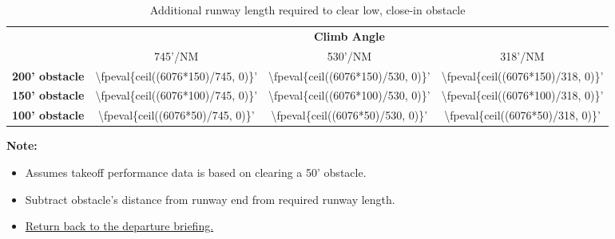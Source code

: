\begin{table}[H]
    \hypertarget{runway-length-table}{\caption{Additional runway length required to clear low, close-in obstacle}}

    \begin{center}
        \begin{tabular}{lccc}
            \toprule
                                   & \multicolumn{3}{c}{\textbf{Climb Angle}}
            \\\cmidrule(lr){2-4}
                                   & 745'/NM                                  & 530'/NM                                 & 318'/NM                                 \\
            \midrule
            \textbf{200' obstacle} & \num{\fpeval{ceil((6076*150)/745, 0)}}'  & \num{\fpeval{ceil((6076*150)/530, 0)}}' & \num{\fpeval{ceil((6076*150)/318, 0)}}' \\
            \textbf{150' obstacle} & \num{\fpeval{ceil((6076*100)/745, 0)}}'  & \num{\fpeval{ceil((6076*100)/530, 0)}}' & \num{\fpeval{ceil((6076*100)/318, 0)}}' \\
            \textbf{100' obstacle} & \num{\fpeval{ceil((6076*50)/745, 0)}}'   & \num{\fpeval{ceil((6076*50)/530, 0)}}'  & \num{\fpeval{ceil((6076*50)/318, 0)}}'  \\
            \bottomrule
        \end{tabular}
    \end{center}

    \textbf{Note:}
    \begin{itemize}
        \item Assumes takeoff performance data is based on clearing a 50' obstacle.
        \item Subtract obstacle's distance from runway end from required runway length.
        \item \hyperlink{departure-briefing}{Return back to the departure briefing.}
    \end{itemize}
\end{table}

{}

